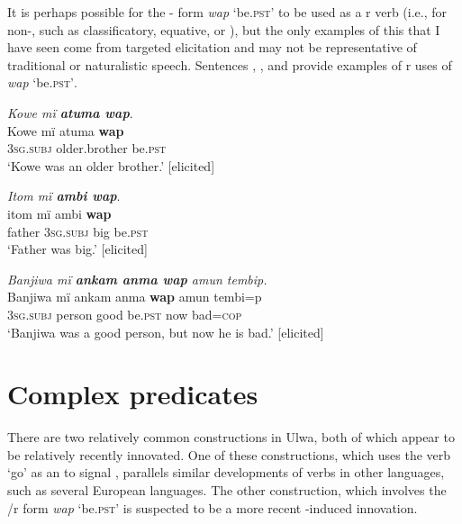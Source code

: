 It is perhaps possible for the -  form \textit{wap} ‘be.\textsc{pst}’ to be used as a r verb (i.e., for non-, such as  classificatory,  equative, or ), but the only examples of this that I have seen come from targeted elicitation and may not be representative of traditional or naturalistic speech. Sentences , , and  provide examples of r uses of \textit{wap} ‘be.\textsc{pst’}.



\ea%
    \label{ex:pred:49}
          \textit{Kowe mï \textbf{atuma wap}}.\\
\gll Kowe  mï      atuma      \textbf{wap}\\
    [name]  \textsc{3sg.subj}  older.brother  be.\textsc{pst}\\
\glt `Kowe was an older brother.’ [elicited]
\z

\ea%
    \label{ex:pred:50}
          \textit{Itom mï \textbf{ambi wap}}.\\
\gll itom  mï      ambi  \textbf{wap}\\
    father  3\textsc{sg.subj}  big    be.\textsc{pst}\\
\glt `Father was big.’ [elicited]
\z

\ea%
    \label{ex:pred:51}
          \textit{Banjiwa mï \textbf{ankam anma wap} amun tembip.}\\
\gll    Banjiwa  mï      ankam  anma  \textbf{wap}  amun  tembi=p\\
    [name]    \textsc{3sg.subj}  person  good  be.\textsc{pst}  now  bad=\textsc{cop}\\
\glt `Banjiwa was a good person, but now he is bad.’ [elicited]
\z

\section{Complex predicates}\label{sec:10.5}


There are two relatively common  constructions in Ulwa, both of which appear to be relatively recently innovated. One of these constructions, which uses the verb ‘go’ as an  to signal  , parallels similar developments of  verbs in other languages, such as several European languages. The other construction, which involves the /r form \textit{wap} ‘be.\textsc{pst}’ is suspected to be a more recent -induced innovation.

